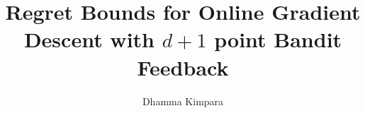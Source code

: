 \documentclass{article}
\theoremstyle{definition}
\begin{document}
\title{Regret Bounds for Online Gradient Descent with $d+1$ point Bandit Feedback}
 \author{Dhamma Kimpara}

\maketitle






\newpage




\newpage

\appendix


\end{document}
